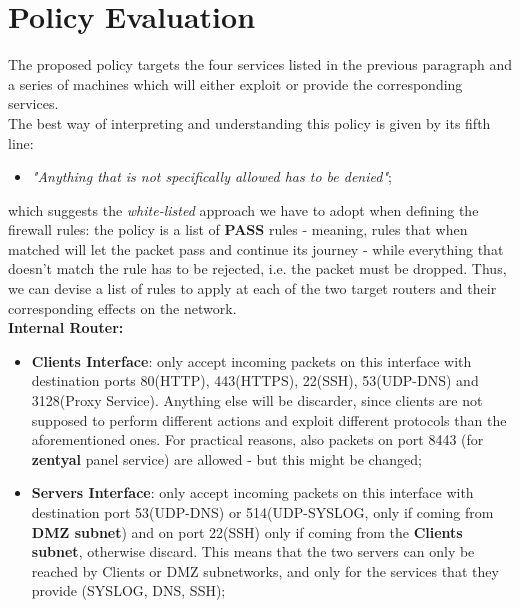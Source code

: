\section{Policy Evaluation}
The proposed policy targets the four services listed in the previous paragraph and a series of machines which will either exploit or provide the corresponding services.\\
The best way of interpreting and understanding this policy is given by its fifth line:\\
\begin{itemize}
\item \textit{"Anything that is not specifically allowed has to be denied"};
\end{itemize}

which suggests the \textit{white-listed} approach we have to adopt when defining the firewall rules: the policy is a list of \textbf{PASS} rules - meaning, rules that when matched will let the packet pass and continue its journey - while everything that doesn't match the rule has to be rejected, i.e. the packet must be dropped. Thus, we can devise a list of rules to apply at each of the two target routers and their corresponding effects on the network.\\

\textbf{Internal Router:}
\begin{itemize}
\item \textbf{Clients Interface}: only accept incoming packets on this interface with destination ports 80(HTTP), 443(HTTPS), 22(SSH), 53(UDP-DNS) and 3128(Proxy Service). Anything else will be discarder, since clients are not supposed to perform different actions and exploit different protocols than the aforementioned ones. For practical reasons, also packets on port 8443 (for \textbf{zentyal} panel service) are allowed - but this might be changed;
\item \textbf{Servers Interface}: only accept incoming packets on this interface with destination port 53(UDP-DNS) or 514(UDP-SYSLOG, only if coming from \textbf{DMZ subnet}) and on port 22(SSH) only if coming from the \textbf{Clients subnet}, otherwise discard. This means that the two servers can only be reached by Clients or DMZ subnetworks, and only for the services that they provide (SYSLOG, DNS, SSH);
\end{itemize}

